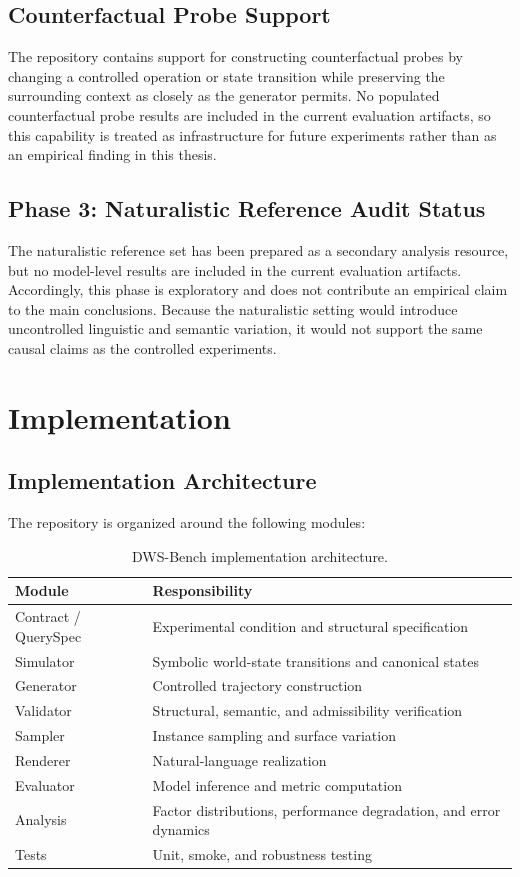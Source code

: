 \documentclass{iutbscthesis}
\begin{document}
\section{Counterfactual Probe Support}
The repository contains support for constructing counterfactual probes by changing a controlled
operation or state transition while preserving the surrounding context as closely as the generator
permits. No populated counterfactual probe results are included in the current evaluation artifacts,
so this capability is treated as infrastructure for future experiments rather than as an empirical
finding in this thesis.

\section{Phase 3: Naturalistic Reference Audit Status}
The naturalistic reference set has been prepared as a secondary analysis resource, but no model-level
results are included in the current evaluation artifacts. Accordingly, this phase is exploratory and
does not contribute an empirical claim to the main conclusions. Because the naturalistic setting would
introduce uncontrolled linguistic and semantic variation, it would not support the same causal claims
as the controlled experiments.

\chapter{Implementation}
\section{Implementation Architecture}
The repository is organized around the following modules:
\begin{table}[H]
\centering
\begin{tabular}{ll}
\toprule
\textbf{Module} & \textbf{Responsibility} \\
\midrule
Contract / QuerySpec & Experimental condition and structural specification \\
Simulator & Symbolic world-state transitions and canonical states \\
Generator & Controlled trajectory construction \\
Validator & Structural, semantic, and admissibility verification \\
Sampler & Instance sampling and surface variation \\
Renderer & Natural-language realization \\
Evaluator & Model inference and metric computation \\
Analysis & Factor distributions, performance degradation, and error dynamics \\
Tests & Unit, smoke, and robustness testing \\
\bottomrule
\end{tabular}
\caption{DWS-Bench implementation architecture.}
\label{tab:implementation}
\end{table}
\end{document}
